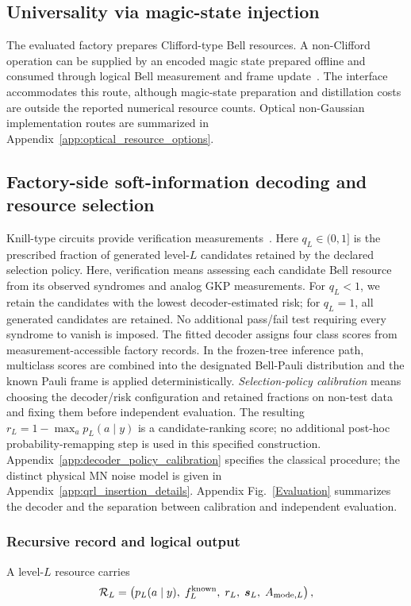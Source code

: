 \documentclass[aps,
prx,
superscriptaddress,
reprint,
longbibliography,
floatfix]{revtex4-2}
\begin{document}
\subsection{Universality via magic-state injection}\label{subsec:universality}\label{subsec:universality_scope}
The evaluated factory prepares Clifford-type Bell resources. A non-Clifford operation can be supplied by an encoded magic state prepared offline and consumed through logical Bell measurement and frame update~\cite{BravyiKitaev2005Magic,BravyiHaah2012Magic}. The interface accommodates this route, although magic-state preparation and distillation costs are outside the reported numerical resource counts. Optical non-Gaussian implementation routes are summarized in Appendix~\ref{app:optical_resource_options}.

\subsection{Factory-side soft-information decoding and resource selection}\label{subsec:postselected_knill}
Knill-type circuits provide verification measurements~\cite{Knill2005,AGP2008Postselection}. Here $q_L\in(0,1]$ is the prescribed fraction of generated level-$L$ candidates retained by the declared selection policy. Here, verification means assessing each candidate Bell resource from its observed syndromes and analog GKP measurements. For $q_L<1$, we retain the candidates with the lowest decoder-estimated risk; for $q_L=1$, all generated candidates are retained. No additional pass/fail test requiring every syndrome to vanish is imposed.
The fitted decoder assigns four class scores from measurement-accessible factory records. In the frozen-tree inference path, multiclass scores are combined into the designated Bell-Pauli distribution and the known Pauli frame is applied deterministically. \emph{Selection-policy calibration} means choosing the decoder/risk configuration and retained fractions on non-test data and fixing them before independent evaluation. The resulting $r_L=1-\max_a p_L(a\mid y)$ is a candidate-ranking score; no additional post-hoc probability-remapping step is used in this specified construction. Appendix~\ref{app:decoder_policy_calibration} specifies the classical procedure; the distinct physical MN noise model is given in Appendix~\ref{app:qrl_insertion_details}. Appendix Fig.~\ref{Evaluation} summarizes the decoder and the separation between calibration and independent evaluation.

\subsubsection{Recursive record and logical output}\label{subsec:recursive_soft_verification}
A level-$L$ resource carries
\begin{equation}
 \mathcal R_L=
 \left(
 p_L(a\mid y),\;f_L^{\rm known},\;r_L,\;\bm s_L,\;A_{{\rm mode},L}
 \right),
\label{eq:recursive_soft_resource_record}
\end{equation}
\end{document}
